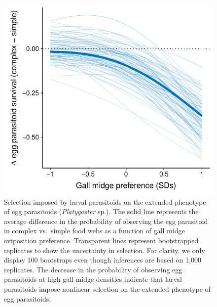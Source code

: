 \documentclass[11pt,]{article}
\begin{document}
\begin{figure}
\centering
\includegraphics{analyses/selection_on_Platygaster.pdf}
\caption{\label{fig:EggPtoid_Selection}Selection imposed by larval
parasitoids on the extended phenotype of egg parasitoids
(\emph{Platygaster} sp.). The solid line represents the average
difference in the probability of observing the egg parasitoid in complex
vs.~simple food webs as a function of gall midge oviposition preference.
Transparent lines represent bootstrapped replicates to show the
uncertainty in selection. For clarity, we only display 100 bootstraps
even though inferences are based on 1,000 replicates. The decrease in
the probability of observing egg parasitoids at high gall-midge
densities indicate that larval parasitoids impose nonlinear selection on
the extended phenotype of egg parasitoids.}
\end{figure}
\end{document}
